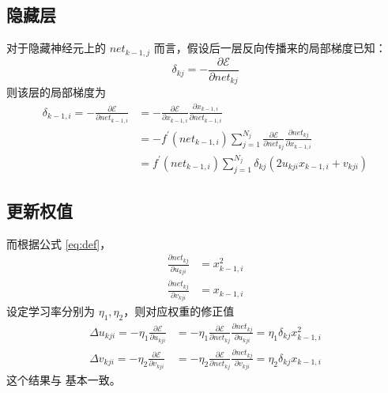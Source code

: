     \subsection{隐藏层}
    对于隐藏神经元上的 $net_{k-1,j}$ 而言，假设后一层反向传播来的局部梯度已知：
    \begin{equation*}
        \delta_{kj} = -\frac{\partial\mathcal{E}}{\partial\mathit{net}_{kj}}
    \end{equation*}
    则该层的局部梯度为
    \begin{align}
        \delta_{k-1,i} = -\frac{\partial\mathcal{E}}{\partial\mathit{net}_{k-1,i}} &= -\frac{\partial\mathcal{E}}{\partial x_{k-1,i}}\frac{\partial x_{k-1,i}}{\partial\mathit{net}_{k-1,i}} \nonumber\\
        &= -f^\prime(\mathit{net}_{k-1,i})\sum_{j=1}^{N_j}\frac{\partial\mathcal{E}}{\partial\mathit{net}_{kj}}\frac{\partial\mathit{net}_{kj}}{\partial x_{k-1,i}} \nonumber\\
        &= f^\prime(\mathit{net}_{k-1,i})\sum_{j=1}^{N_j}\delta_{kj}(2u_{kji}x_{k-1,i}+v_{kji})\label{eq:hiddenlocalgrad}
    \end{align}
    \subsection{更新权值}
    而根据公式 \eqref{eq:def}，
    \begin{align*}
        \frac{\partial\mathit{net}_{kj}}{\partial u_{kji}} &= x_{k-1,i}^2 \\
        \frac{\partial\mathit{net}_{kj}}{\partial v_{kji}} &= x_{k-1,i}
    \end{align*}
    设定学习率分别为 $\eta_1,\eta_2$，则对应权重的修正值
    \begin{align}
        \Delta u_{kji} = -\eta_1\frac{\partial\mathcal{E}}{\partial u_{kji}} 
        &=-\eta_1\frac{\partial\mathcal{E}}{\partial\mathit{net}_{kj}}\frac{\partial\mathit{net}_{kj}}{\partial u_{kji}}=\eta_1\delta_{kj}x_{k-1,i}^2 \label{eq:u}\\
        \Delta v_{kji} = -\eta_2\frac{\partial\mathcal{E}}{\partial v_{kji}} &=-\eta_2\frac{\partial\mathcal{E}}{\partial\mathit{net}_{kj}}\frac{\partial\mathit{net}_{kj}}{\partial v_{kji}}= \eta_2\delta_{kj}x_{k-1,i} \label{eq:v}
    \end{align}
    这个结果与 \cite{MLQP} 基本一致。

